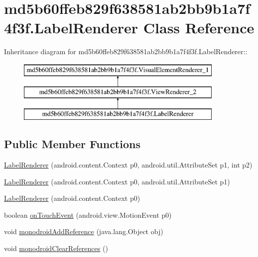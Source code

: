 \hypertarget{classmd5b60ffeb829f638581ab2bb9b1a7f4f3f_1_1_label_renderer}{
\section{md5b60ffeb829f638581ab2bb9b1a7f4f3f.LabelRenderer Class Reference}
\label{classmd5b60ffeb829f638581ab2bb9b1a7f4f3f_1_1_label_renderer}
}
Inheritance diagram for md5b60ffeb829f638581ab2bb9b1a7f4f3f.LabelRenderer::\begin{figure}[H]
\begin{center}
\leavevmode
\includegraphics[height=3cm]{classmd5b60ffeb829f638581ab2bb9b1a7f4f3f_1_1_label_renderer}
\end{center}
\end{figure}
\subsection*{Public Member Functions}
\begin{CompactItemize}
\item 
\hyperlink{classmd5b60ffeb829f638581ab2bb9b1a7f4f3f_1_1_label_renderer_676d9f280baafbc8b1cd2f8d192d5420}{LabelRenderer} (android.content.Context p0, android.util.AttributeSet p1, int p2)
\item 
\hyperlink{classmd5b60ffeb829f638581ab2bb9b1a7f4f3f_1_1_label_renderer_df11c884aea9ad69b88f2bc2c1c60b48}{LabelRenderer} (android.content.Context p0, android.util.AttributeSet p1)
\item 
\hyperlink{classmd5b60ffeb829f638581ab2bb9b1a7f4f3f_1_1_label_renderer_145238d242c95398df7762a0dee92f4c}{LabelRenderer} (android.content.Context p0)
\item 
boolean \hyperlink{classmd5b60ffeb829f638581ab2bb9b1a7f4f3f_1_1_label_renderer_364b8f793419ee7c9d991b140708c0b5}{onTouchEvent} (android.view.MotionEvent p0)
\item 
void \hyperlink{classmd5b60ffeb829f638581ab2bb9b1a7f4f3f_1_1_label_renderer_5c75833e54cbdb93423612b6013f3ca2}{monodroidAddReference} (java.lang.Object obj)
\item 
void \hyperlink{classmd5b60ffeb829f638581ab2bb9b1a7f4f3f_1_1_label_renderer_8dd6dcc97dd63731d463ac57c6c6bf08}{monodroidClearReferences} ()
\end{CompactItemize}
